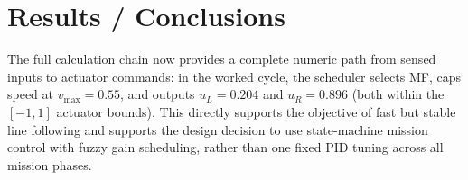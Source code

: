 \documentclass{article}
\begin{document}
\section{Results / Conclusions}
The full calculation chain now provides a complete numeric path from sensed inputs to actuator commands: in the worked cycle, the scheduler selects MF, caps speed at $v_{\max}=0.55$, and outputs $u_L=0.204$ and $u_R=0.896$ (both within the $[-1,1]$ actuator bounds). This directly supports the objective of fast but stable line following and supports the design decision to use state-machine mission control with fuzzy gain scheduling, rather than one fixed PID tuning across all mission phases.
\end{document}
